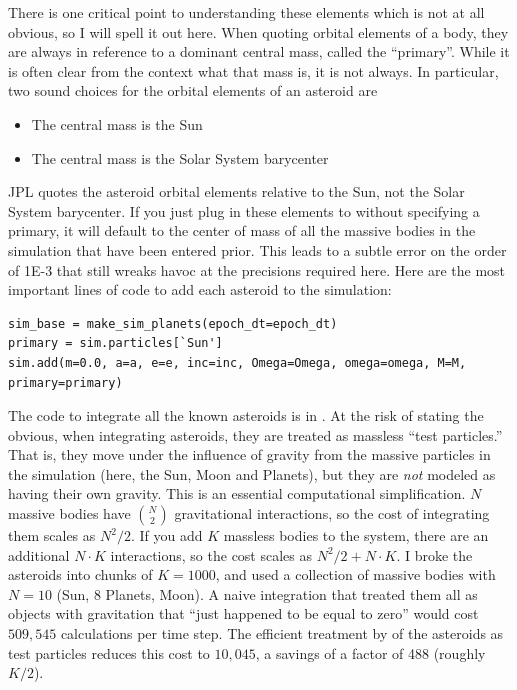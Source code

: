 There is one critical point to understanding these elements which is not at all obvious, so I will spell it out here.
When quoting orbital elements of a body, they are always in reference to a dominant central mass, called the ``primary''.
While it is often clear from the context what that mass is, it is not always.
In particular, two sound choices for the orbital elements of an asteroid are
\begin{samepage}
\begin{itemize}
\item The central mass is the Sun
\item The central mass is the Solar System barycenter
\end{itemize}
\end{samepage}
JPL quotes the asteroid orbital elements relative to the Sun, not the Solar System barycenter.
If you just plug in these elements to  without specifying a primary, 
it will default to the center of mass of all the massive bodies in the simulation that have been entered prior.
This leads to a subtle error on the order of 1E-3 that still wreaks havoc at the precisions required here.
Here are the most important lines of code to add each asteroid to the simulation:
\begin{lstlisting}[style=CodeSnippet]
sim_base = make_sim_planets(epoch_dt=epoch_dt)
primary = sim.particles[`Sun']
sim.add(m=0.0, a=a, e=e, inc=inc, Omega=Omega, omega=omega, M=M, primary=primary)
\end{lstlisting}

The code to integrate all the known asteroids is in .
At the risk of stating the obvious, when integrating asteroids, they are treated as massless ``test particles.''
That is, they move under the influence of gravity from the massive particles in the simulation (here, the Sun, Moon and Planets),
but they are \textit{not} modeled as having their own gravity.
This is an essential computational simplification.
$N$ massive bodies have ${N}\choose{2}$ gravitational interactions, so the cost of integrating them scales as $N^2 / 2$.
If you add $K$ massless bodies to the system, there are an additional $N\cdot K$ interactions, so the cost scales as $N^2 / 2 + N \cdot K$.
I broke the asteroids into chunks of $K=1000$, and used a collection of massive bodies with $N=10$ (Sun, 8 Planets, Moon).
A naive integration that treated them all as objects with gravitation that ``just happened to be equal to zero'' would cost $509,545$ calculations per time step.
The efficient treatment by  of the asteroids as test particles reduces this cost to $10,045$, a savings of a factor of 488 (roughly $K/2$).

